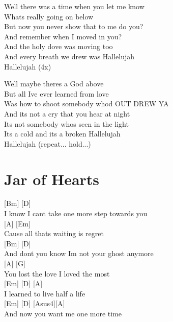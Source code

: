 \documentclass[
  letterpaper,
]{scrbook}
\begin{document}
Well there was a time when you let me know\\
What\textquotesingle s really going on below\\
But now you never show that to me do you?\\
And remember when I moved in you?\\
And the holy dove was moving too\\
And every breath we drew was Hallelujah\\
Hallelujah (4x)

Well maybe there\textquotesingle s a God above\\
But all I\textquotesingle ve ever learned from love\\
Was how to shoot somebody who\textquotesingle d OUT DREW YA\\
And it\textquotesingle s not a cry that you hear at night\\
It\textquotesingle s not somebody who\textquotesingle s seen in the
light\\
It\textquotesingle s a cold and it\textquotesingle s a broken
Hallelujah\\
Hallelujah (repeat... hold...)

\hypertarget{jar-of-hearts}{%
\chapter{Jar of Hearts}\label{jar-of-hearts}}

{[}Bm{]} {[}D{]}\\
I know I can\textquotesingle t take one more step towards you\\
{[}A{]} {[}Em{]}\\
\textquotesingle Cause all thats waiting is regret\\
{[}Bm{]} {[}D{]}\\
And don\textquotesingle t you know I\textquotesingle m not your ghost
anymore\\
{[}A{]} {[}G{]}\\
You lost the love I loved the most\\
{[}Em{]} {[}D{]} {[}A{]}\\
I learned to live half a life\\
{[}Em{]} {[}D{]} {[}Asus4{]}{[}A{]}\\
And now you want me one more time
\end{document}
